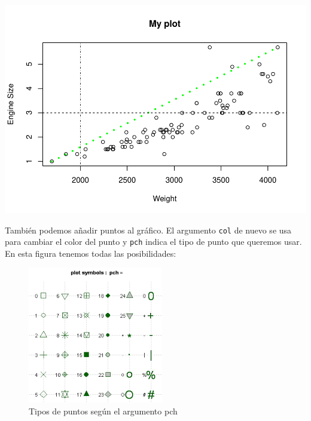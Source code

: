 \documentclass[
]{book}
\newenvironment{Shaded}{\begin{snugshade}}{\end{snugshade}}
\newcommand{\AttributeTok}[1]{\textcolor[rgb]{0.77,0.63,0.00}{#1}}
\newcommand{\DecValTok}[1]{\textcolor[rgb]{0.00,0.00,0.81}{#1}}
\newcommand{\FunctionTok}[1]{\textcolor[rgb]{0.00,0.00,0.00}{#1}}
\newcommand{\NormalTok}[1]{#1}
\newcommand{\SpecialCharTok}[1]{\textcolor[rgb]{0.00,0.00,0.00}{#1}}
\newcommand{\StringTok}[1]{\textcolor[rgb]{0.31,0.60,0.02}{#1}}
\begin{document}
\includegraphics{fig/unnamed-chunk-92-1.pdf}

También podemos añadir puntos al gráfico. El argumento \texttt{col} de nuevo se usa para cambiar el color del punto y \texttt{pch} indica el tipo de punto que queremos usar. En esta figura tenemos todas las posibilidades:

\begin{figure}
\centering
\includegraphics{figures/pch.png}
\caption{Tipos de puntos según el argumento pch}
\end{figure}

\begin{Shaded}
\end{Shaded}
\end{document}
